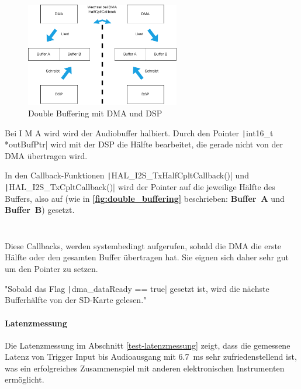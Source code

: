 \begin{figure}[H]
	\centering
	\includegraphics[width=0.6\textwidth]{images/08_durchfuehrung/audio/double_buffering.drawio.png}
	\caption{Double Buffering mit DMA und DSP}
	\label{fig:double_buffering}
\end{figure}


Bei I M A wird wird der Audiobuffer halbiert. %
Durch den Pointer \texttt|int16_t *outBufPtr| wird mit der DSP die Hälfte bearbeitet, die gerade nicht von der DMA übertragen wird.

In den Callback-Funktionen \texttt|HAL_I2S_TxHalfCpltCallback()| und \texttt|HAL_I2S_TxCpltCallback()| wird der Pointer auf die jeweilige Hälfte des Buffers, also auf (wie in  \textbf{\autoref{fig:double_buffering}} beschrieben:
\textbf{Buffer~A} und \textbf{Buffer~B}) gesetzt.


\inputminted[firstline=28, lastline=31]{c}{../../f401_sd_card_audio_codec_test/Core/Src/audio.c}

\inputminted[firstline=40, lastline=43]{c}{../../f401_sd_card_audio_codec_test/Core/Src/audio.c}


Diese Callbacks, werden systembedingt aufgerufen, sobald die DMA die erste Hälfte oder den gesamten Buffer übertragen hat. Sie eignen sich daher sehr gut um den Pointer zu setzen.

"Sobald das Flag \texttt|dma_dataReady == true| gesetzt ist, wird die nächste Bufferhälfte von der SD-Karte gelesen."

\paragraph{Latenzmessung}

Die Latenzmessung im Abschnitt \ref{test-latenzmessung} zeigt, dass die gemessene Latenz von Trigger Input bis Audioausgang mit \SI{6.7}{\milli\second} sehr zufriedenstellend ist, was ein erfolgreiches Zusammenspiel mit anderen elektronischen Instrumenten ermöglicht.


